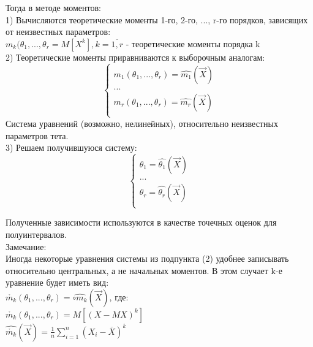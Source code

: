 Тогда в методе моментов:\\
1) Вычисляются теоретические моменты 1-го, 2-го, ..., r-го порядков, зависящих от неизвестных параметров:\\
$m_{k}(\theta_{1}, ..., \theta_{r} = M[X^{k}], k = \overline{1, r}$ - теоретические моменты порядка k\\

2) Теоретические моменты приравниваются к выборочным аналогам:\\

\begin{equation}
\begin{cases}
m_{1}(\theta_{1}, ..., \theta_{r}) = \hat{m_{1}}(\overrightarrow{X})\\
...\\
m_{r}(\theta_{1}, ..., \theta_{r}) = \hat{m_{r}}(\overrightarrow{X})\\
\end{cases}
\end{equation}
Система уравнений (возможно, нелинейных), относительно неизвестных параметров тета.\\

3) Решаем получившуюся систему:\\
\begin{equation}
\begin{cases}
\theta_{1} = \hat{\theta_{1}}(\overrightarrow{X})\\
...\\
\theta_{r} = \hat{\theta_{r}}(\overrightarrow{X})\\
\end{cases}
\end{equation}

Полученные зависимости используются в качестве точечных оценок для полуинтервалов.\\

Замечание:\\
Иногда некоторые уравнения системы из подпункта (2) удобнее записывать относительно центральных, а не начальных моментов. В этом случает k-е уравнение будет иметь вид:\\
$\mathring{m_{k}}(\theta_{1}, ..., \theta_{r}) = \hat{\circ{m_{k}}}(\overrightarrow{X})$, где:\\
$\mathring{m_{k}}(\theta_{1}, ..., \theta_{r}) = M[(X - MX)^{k}]$\\
$\hat{\mathring{m_{k}}}(\overrightarrow{X}) = \frac{1}{n}\sum\limits_{i=1}^{n}(X_{i} - \overline{X})^{k}$\\

